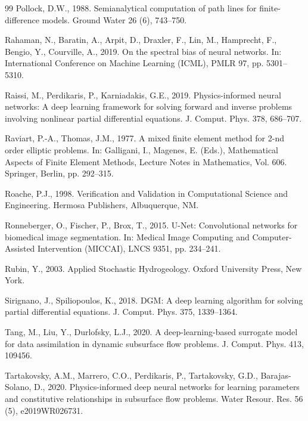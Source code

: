 \documentclass[preprint,12pt,authoryear]{elsarticle}
\begin{document}
\begin{thebibliography}{99}
Pollock, D.W., 1988. Semianalytical computation of path lines for finite-difference models. Ground Water 26 (6), 743--750.

Rahaman, N., Baratin, A., Arpit, D., Draxler, F., Lin, M., Hamprecht, F., Bengio, Y., Courville, A., 2019. On the spectral bias of neural networks. In: International Conference on Machine Learning (ICML), PMLR 97, pp. 5301--5310.

Raissi, M., Perdikaris, P., Karniadakis, G.E., 2019. Physics-informed neural networks: A deep learning framework for solving forward and inverse problems involving nonlinear partial differential equations. J. Comput. Phys. 378, 686--707.

Raviart, P.-A., Thomas, J.M., 1977. A mixed finite element method for 2-nd order elliptic problems. In: Galligani, I., Magenes, E. (Eds.), Mathematical Aspects of Finite Element Methods, Lecture Notes in Mathematics, Vol. 606. Springer, Berlin, pp. 292--315.

Roache, P.J., 1998. Verification and Validation in Computational Science and Engineering. Hermosa Publishers, Albuquerque, NM.

Ronneberger, O., Fischer, P., Brox, T., 2015. U-Net: Convolutional networks for biomedical image segmentation. In: Medical Image Computing and Computer-Assisted Intervention (MICCAI), LNCS 9351, pp. 234--241.

Rubin, Y., 2003. Applied Stochastic Hydrogeology. Oxford University Press, New York.

Sirignano, J., Spiliopoulos, K., 2018. DGM: A deep learning algorithm for solving partial differential equations. J. Comput. Phys. 375, 1339--1364.

Tang, M., Liu, Y., Durlofsky, L.J., 2020. A deep-learning-based surrogate model for data assimilation in dynamic subsurface flow problems. J. Comput. Phys. 413, 109456.

Tartakovsky, A.M., Marrero, C.O., Perdikaris, P., Tartakovsky, G.D., Barajas-Solano, D., 2020. Physics-informed deep neural networks for learning parameters and constitutive relationships in subsurface flow problems. Water Resour. Res. 56 (5), e2019WR026731.


\end{thebibliography}
\end{document}
